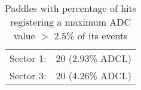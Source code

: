 \begin{table}
\begin{minipage}{\textwidth}
\begin{center}
\begin{singlespacing}

\caption{\label{tab:adcM}Paddles with percentage of hits registering a maximum ADC value \( > \) 2.5\% of its events}

\begin{tabular}{lc}

\hline \hline

Sector 1: & 20 (2.93\% ADCL) \\
Sector 3: & 20 (4.26\% ADCL) \\

\hline \hline

\end{tabular}

\end{singlespacing}
\end{center}
\end{minipage}
\end{table}

